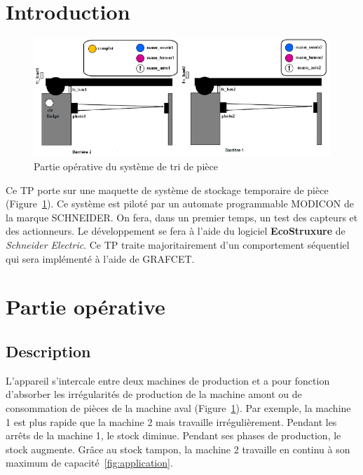 \documentclass[11pt, multicol]{article}
\begin{document}
\UPSTIbuildPage
{}

\tableofcontents


\section{Introduction}
\begin{figure}[ht]
	\centering
	\includegraphics[width=.8\linewidth]{images/schemaSysteme}
	\caption{Partie opérative du système de tri de pièce}
	\label{fig:schemaPartieOperative}
\end{figure}
Ce TP porte sur une maquette de système de stockage temporaire de pièce (Figure~\ref{fig:schemaPartieOperative}). Ce système est piloté par un automate programmable MODICON de la marque SCHNEIDER. On fera, dans un premier temps, un test des capteurs et des actionneurs.
Le développement se fera à l'aide du logiciel \textbf{EcoStruxure} de \textit{Schneider Electric}. Ce TP traite majoritairement d'un comportement séquentiel qui sera implémenté à l'aide de GRAFCET.

\section{Partie opérative}
\subsection{Description}
L’appareil s’intercale entre deux machines de production et a pour fonction d’absorber les
irrégularités de production de la machine amont ou de consommation de pièces de la machine
aval (Figure~\ref{fig:schemaPartieOperative}).
Par exemple, la machine 1  est plus rapide que la machine 2 mais travaille irrégulièrement. Pendant
les arrêts de la machine 1, le stock diminue. Pendant ses phases de production, le stock
augmente. Grâce au stock tampon, la machine 2 travaille en continu à son maximum de
capacité~\ref{fig:application}.
\end{document}
